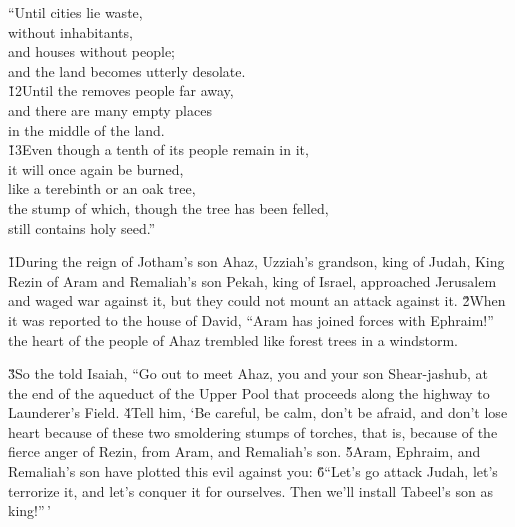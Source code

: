 \begin{poetry}
\poeml ``Until cities lie waste, \\
\poemll    without inhabitants, \\
\poeml and houses without people; \\
\poemll    and the land becomes utterly desolate. \\
\poeml \v{12}Until the  removes people far away, \\
\poemll    and there are many empty places \\
\poemlll       in the middle of the land. \\
\poeml \v{13}Even though a tenth of its people remain in it, \\
\poemll    it will once again be burned, \\
\poeml like a terebinth or an oak tree, \\
\poemll    the stump of which, though the tree has been felled, \\
\poemlll       still contains holy seed.''
\end{poetry}

\v{1}During the reign of Jotham's son Ahaz, Uzziah's grandson, king of Judah, King Rezin of Aram and Remaliah's son Pekah, king of Israel, approached Jerusalem and waged war against it, but they could not mount an attack against it. \v{2}When it was reported to the house of David, ``Aram has joined forces with Ephraim!'' the heart of the people of Ahaz trembled like forest trees in a windstorm.

\v{3}So the  told Isaiah, ``Go out to meet Ahaz, you and your son Shear-jashub, at the end of the aqueduct of the Upper Pool that proceeds along the highway to Launderer's Field. \v{4}Tell him, `Be careful, be calm, don't be afraid, and don't lose heart because of these two smoldering stumps of torches, that is, because of the fierce anger of Rezin, from Aram, and Remaliah's son. \v{5}Aram, Ephraim, and Remaliah's son have plotted this evil against you: \v{6}``Let's go attack Judah, let's terrorize it, and let's conquer it for ourselves. Then we'll install Tabeel's son as king!''\,'

